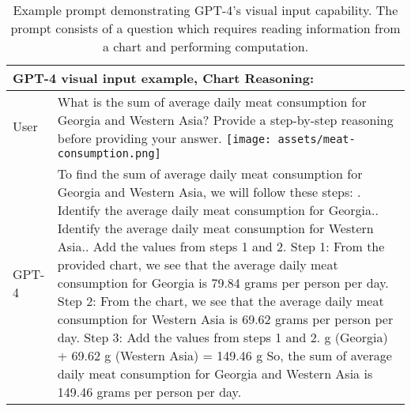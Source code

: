\documentclass{article}
\begin{document}
\begin{table}
\begin{tabular}[]{p{0.5in}p{4.5in}}
\toprule
\multicolumn{2}{p{5in}}{
\textbf{GPT-4 visual input example, Chart Reasoning}:}\\
\midrule
User & What is the sum of average daily meat consumption for Georgia and Western Asia? Provide a step-by-step reasoning before providing your answer.\newline\newline
\texttt{[image: assets/meat-consumption.png]}\newline
\\
GPT-4 & To find the sum of average daily meat consumption for Georgia and Western Asia, we will follow these steps:\newline
\newline
1. Identify the average daily meat consumption for Georgia.\newline
2. Identify the average daily meat consumption for Western Asia.\newline
3. Add the values from steps 1 and 2.\newline
\newline
Step 1: From the provided chart, we see that the average daily meat consumption for Georgia is 79.84 grams per person per day.\newline
Step 2: From the chart, we see that the average daily meat consumption for Western Asia is 69.62 grams per person per day.\newline
Step 3: Add the values from steps 1 and 2.\newline
79.84 g (Georgia) + 69.62 g (Western Asia) = 149.46 g\newline
\newline
So, the sum of average daily meat consumption for Georgia and Western Asia is 149.46 grams per person per day.\\
\bottomrule
\end{tabular}
\caption{Example prompt demonstrating GPT-4's visual input capability. The prompt consists of a question which requires reading information from a chart and performing computation.}
\label{table:visual_input_chart}
\end{table}
\end{document}
